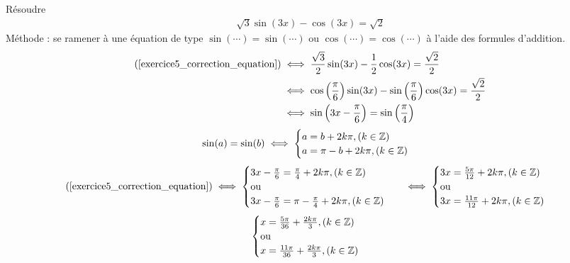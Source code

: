 \begin{exercice}
    Résoudre 
    \begin{align}\label{exercice5_correction_equation}
        \sqrt{3} \sin(3x) - \cos(3x) = \sqrt{2}
    \end{align}
Méthode : se ramener à une équation de type $\sin(\cdots) = \sin(\cdots)$ ou $\cos(\cdots) = \cos(\cdots)$ à l'aide des formules d'addition.
    \begin{align*}
        (\ref{exercice5_correction_equation}) &\iff \frac{\sqrt{3}}{2} \sin(3x) - \frac{1}{2} \cos(3x) = \frac{\sqrt{2}}{2} \\
                                         &\iff \cos\left(\frac{\pi}{6}\right)\sin(3x) - \sin\left(\frac{\pi}{6}\right)\cos(3x) = \frac{\sqrt{2}}{2} \\
                                         &\iff \sin\left(3x - \frac{\pi}{6}\right) = \sin\left(\frac{\pi}{4}\right)
    \end{align*}
    \begin{align*}
        \sin(a) = \sin(b) \iff 
        \begin{cases}
            a = b + 2k\pi, (k \in \mathbb{Z}) \\
            a = \pi - b +2k\pi, (k \in \mathbb{Z})
        \end{cases}
    \end{align*}
    \begin{align*}
        (\ref{exercice5_correction_equation}) &\iff 
        \begin{cases}
            3x - \frac{\pi}{6} = \frac{\pi}{4} + 2k\pi, (k \in \mathbb{Z}) \\
            \text{ou} \\
            3x - \frac{\pi}{6} = \pi - \frac{\pi}{4} + 2k \pi, (k \in \mathbb{Z}) 
        \end{cases}
                                         &\iff
        \begin{cases}
            3x = \frac{5\pi}{12} + 2k\pi, (k \in \mathbb{Z}) \\
            \text{ou} \\
            3x = \frac{11\pi}{12} + 2k\pi, (k \in \mathbb{Z})
        \end{cases}
    \end{align*}
	\begin{align*}
		\begin{cases}
			x = \frac{5\pi}{36}+ \frac{2k\pi}{3}, (k \in \mathbb{Z}) \\
			\text{ou} \\
			x = \frac{11\pi}{36} + \frac{2k\pi}{3}, (k \in \mathbb{Z})
		\end{cases}
	\end{align*}
\end{exercice}